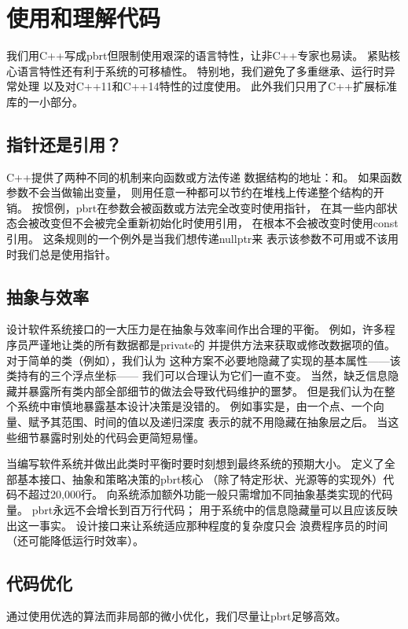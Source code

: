 \section{使用和理解代码}\label{sec:使用和理解代码}

我们用C++写成pbrt但限制使用艰深的语言特性，让非C++专家也易读。
紧贴核心语言特性还有利于系统的可移植性。
特别地，我们避免了多重继承、运行时异常处理
以及对C++11和C++14特性的过度使用。
此外我们只用了C++扩展标准库的一小部分。

\subsection{指针还是引用？}\label{sub:指针还是引用？}
C++提供了两种不同的机制来向函数或方法传递
数据结构的地址：和。
如果函数参数不会当做输出变量，
则用任意一种都可以节约在堆栈上传递整个结构的开销。
按惯例，pbrt在参数会被函数或方法完全改变时使用指针，
在其一些内部状态会被改变但不会被完全重新初始化时使用引用，
在根本不会被改变时使用{\ttfamily const}引用。
这条规则的一个例外是当我们想传递{\ttfamily nullptr}来
表示该参数不可用或不该用时我们总是使用指针。

\subsection{抽象与效率}\label{sub:抽象与效率}
设计软件系统接口的一大压力是在抽象与效率间作出合理的平衡。
例如，许多程序员严谨地让类的所有数据都是{\ttfamily private}的
并提供方法来获取或修改数据项的值。
对于简单的类（例如），我们认为
这种方案不必要地隐藏了实现的基本属性——该类持有的三个浮点坐标——
我们可以合理认为它们一直不变。
当然，缺乏信息隐藏并暴露所有类内部全部细节的做法会导致代码维护的噩梦。
但是我们认为在整个系统中审慎地暴露基本设计决策是没错的。
例如事实是，由一个点、一个向量、赋予其范围、时间的值以及递归深度
表示的就不用隐藏在抽象层之后。
当这些细节暴露时别处的代码会更简短易懂。

当编写软件系统并做出此类时平衡时要时刻想到最终系统的预期大小。
定义了全部基本接口、抽象和策略决策的pbrt核心
（除了特定形状、光源等的实现外）代码不超过20,000行。
向系统添加额外功能一般只需增加不同抽象基类实现的代码量。
pbrt永远不会增长到百万行代码；
用于系统中的信息隐藏量可以且应该反映出这一事实。
设计接口来让系统适应那种程度的复杂度只会
浪费程序员的时间（还可能降低运行时效率）。

\subsection{代码优化}\label{sub:代码优化}
通过使用优选的算法而非局部的微小优化，我们尽量让pbrt足够高效。